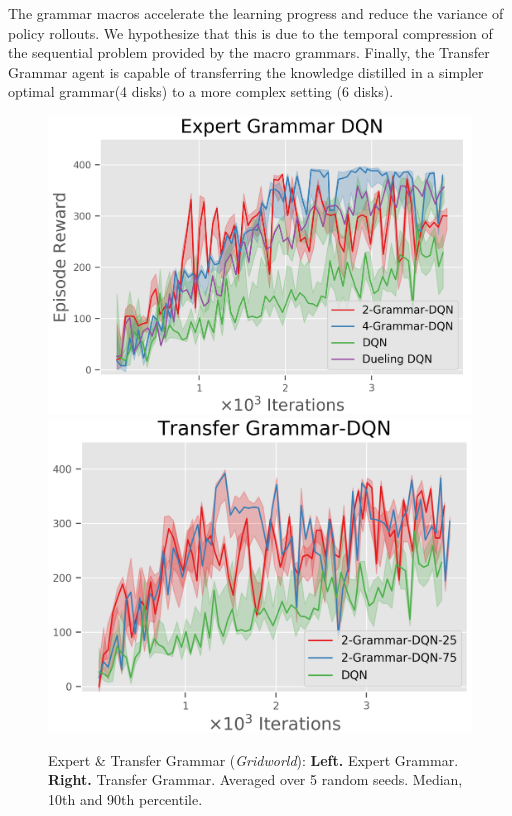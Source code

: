 \documentclass[10pt,letterpaper]{article}
\begin{document}
The grammar macros accelerate the learning progress and reduce the variance of policy rollouts. We hypothesize that this is due to the temporal compression of the sequential problem provided by the macro grammars.
Finally, the Transfer Grammar agent is capable of transferring the knowledge distilled in a simpler optimal grammar(4 disks) to a more complex setting (6 disks).  

\begin{figure}[H]
  \includegraphics[width=\linewidth]{figures/grammar_dqn_gridworld_expert}
\endminipage\hfill
{}
  \includegraphics[width=\linewidth]{figures/grammar_dqn_gridworld_transfer}
\endminipage\hfill
\caption{Expert \& Transfer Grammar (\textit{Gridworld}): \textbf{Left.} Expert Grammar. \textbf{Right.} Transfer Grammar. Averaged over 5 random seeds. Median, 10th and 90th percentile.}
\label{fig:expert_grammar_grid}
\end{figure}
\end{document}
